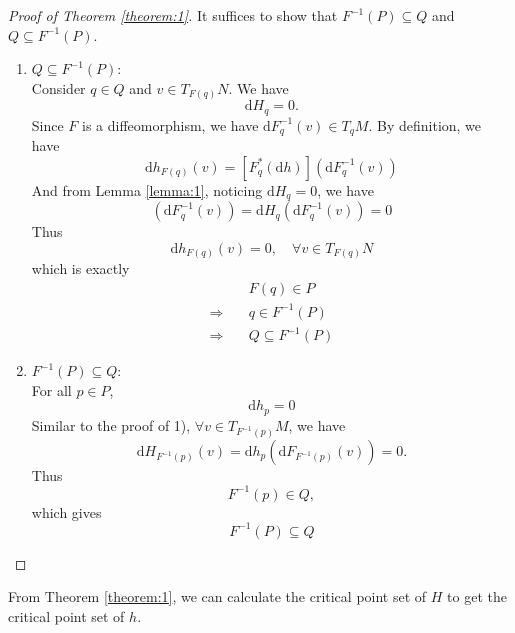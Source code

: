 \documentclass{article}
\begin{document}
\begin{proof}[Proof of Theorem \ref{theorem:1}]
  It suffices to show that $F^{-1}(P) \subseteq Q$ and $Q \subseteq F^{-1}(P)$.
  \begin{enumerate}[{1)}]
    \item $Q \subseteq F^{-1}(P)$: \\
    Consider $ q \in Q$ and $v \in T_{F(q)} N$. We have $$\mathrm{d}H_q = 0.$$ Since $F$ is a diffeomorphism, we have $\mathrm{d}F^{-1}_q(v) \in T_qM$. By definition, we have
    \begin{equation}
      \mathrm{d}h_{F(q)}(v) = [F_q^*(\mathrm{d}h)](\mathrm{d}F^{-1}_q(v))
    \end{equation}
    And from Lemma \ref{lemma:1}, noticing $\mathrm{d}H_q = 0$, we have
    \begin{equation}
      [F_q^*(\mathrm{d}h)](\mathrm{d}F^{-1}_q(v)) = \mathrm{d}H_q(\mathrm{d}F^{-1}_q(v)) = 0
    \end{equation}
    Thus
    \begin{equation}
      \mathrm{d}h_{F(q)}(v) = 0, \quad \forall v \in T_{F(q)} N
    \end{equation}
    which is exactly
    \begin{align}
      &  F(q) \in P \\
      \Rightarrow\quad & q \in F^{-1}(P) \\
      \Rightarrow\quad & Q \subseteq F^{-1}(P)
    \end{align}
    \item $F^{-1}(P) \subseteq Q$: \\
    For all $p \in P$,
    \begin{equation}
      \mathrm{d}h_p = 0
    \end{equation}
    Similar to the proof of 1), $\forall v \in T_{F^{-1}(p)}M$, we have
    \begin{equation}
      \mathrm{d}H_{F^{-1}(p)}(v) = \mathrm{d}h_p(\mathrm{d}F_{F^{-1}(p)}(v)) =  0.
    \end{equation}
    Thus 
    \begin{equation}
      F^{-1}(p) \in Q,
    \end{equation}
    which gives
    \begin{equation}
      F^{-1}(P) \subseteq Q
    \end{equation}
  \end{enumerate}
  
\end{proof}

From Theorem \ref{theorem:1}, we can calculate the critical point set of $H$ to get the critical point set of $h$.



\end{document}
